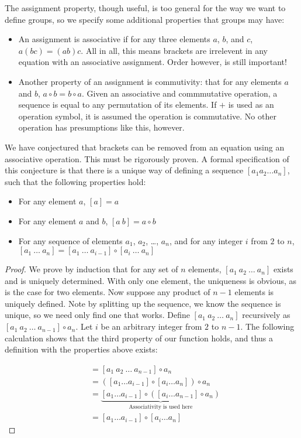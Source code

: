 \documentclass{report}
\begin{document}
The assignment property, though useful, is too general for the way we want to define groups, so we specify some additional properties that groups may have:
\begin{itemize}
    \item An assignment is associative if for any three elements $a$, $b$, and $c$, $a(bc) = (ab)c$. All in all, this means brackets are irrelevent in any equation with an associative assignment. Order however, is still important!
    \item Another property of an assignment is commutivity: that for any elements $a$ and $b$, $a \circ b = b \circ a$. Given an associative and commmutative operation, a sequence is equal to any permutation of its elements. If $+$ is used as an operation symbol, it is assumed the operation is commutative. No other operation has presumptions like this, however.
\end{itemize}

We have conjectured that brackets can be removed from an equation using an associative operation. This must be rigorously proven. A formal specification of this conjecture is that there is a unique way of defining a sequence $[a_1 a_2 \dots a_n]$, such that the following properties hold:
\begin{itemize}
    \item For any element $a$, $[a] = a$
    \item For any element $a$ and $b$, $[a\ b] = a \circ b$
    \item For any sequence of elements $a_1$, $a_2$, \dots, $a_n$, and for any integer $i$ from $2$ to $n$, $[a_1\ \dots\ a_n] = [a_1\ \dots\ a_{i-1}] \circ [a_i\ \dots\ a_n]$
\end{itemize}
\begin{proof}
    We prove by induction that for any set of $n$ elements, $[a_1\ a_2\ \dots\ a_n]$ exists and is uniquely determined. With only one element, the uniqueness is obvious, as is the case for two elements. Now suppose any product of $n-1$ elements is uniquely defined. Note by splitting up the sequence, we know the sequence is unique, so we need only find one that works. Define $[a_1\ a_2\ \dots\ a_n]$ recursively as $[a_1\ a_2\ \dots\ a_{n-1}] \circ a_n$. Let $i$ be an arbitrary integer from $2$ to $n-1$. The following calculation shows that the third property of our function holds, and thus a definition with the properties above exists:

    \begin{align*}
    [a_1\ a_2\ \dots\ a_n] &= [a_1\ a_2\ \dots\ a_{n-1}] \circ a_n\\
    &= ([a_1 \dots a_{i-1}] \circ [a_i \dots a_n]) \circ a_n\\
    &= \underbrace{[a_1 \dots a_{i-1}] \circ ([a_i \dots a_{n-1}] \circ a_n)}_\text{Associativity is used here}\\
    &= [a_1 \dots a_{i-1}] \circ [a_i \dots a_n]
    \end{align*}
\end{proof}
\end{document}
